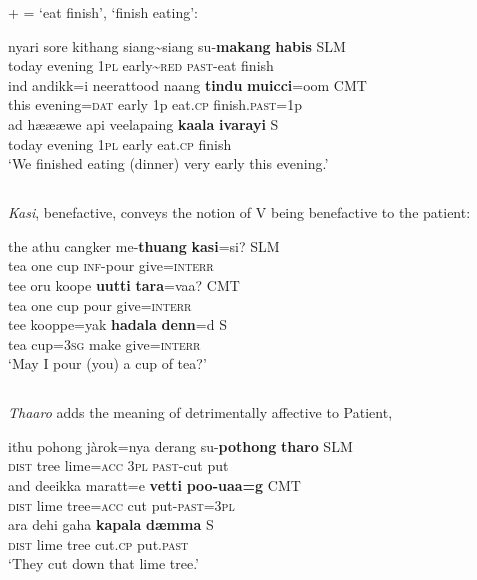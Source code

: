  +  = `eat finish', `finish eating':

\ea\label{jaffar:ex:55}
\ea
\gll nyari sore kithang siang\~{}siang su-\textbf{makang} \textbf{habis} SLM \\
 today evening 1\textsc{pl}    early\~{}\textsc{red} \textsc{past}-eat finish\\
\ex%
\gll ind{\E} andikk=i neerattood{\E} naang{\E} \textbf{tindu}              \textbf{mu{\dz}icci{\textrtailt}{\textrtailt}}=oom CMT \\
 this evening=\textsc{dat}  early     1p  eat.\textsc{cp}  finish.\textsc{past}=1p\\
\ex%
\gll ad{\E} h{\ae}{\und}{\ae}{\ae}we api veelapaing \textbf{kaala} \textbf{ivarayi} S \\
 today evening 1\textsc{pl} early eat.\textsc{cp}  finish\\
`We finished eating (dinner) very early this evening.'
\z{}
\z

\subsection{}
{\em Kasi}, benefactive, conveys the notion of V being benefactive to the patient:

\ea
\ea\label{jaffar:ex:58}
\gll the athu cangker me-\textbf{thuang} \textbf{kasi}=si? SLM \\
 tea one cup \textsc{inf}-pour give=\textsc{interr}\\
\ex%
\gll tee oru koope \textbf{uutti} \textbf{tara}=vaa? CMT \\
 tea one cup pour give=\textsc{interr}\\
\ex%
\gll tee kooppe=yak \textbf{hadala} \textbf{denn{\E}}=d{\E} S \\
 tea cup=3\textsc{sg} make give=\textsc{interr}\\
 `May I pour (you) a cup of tea?'
\z
\z

\subsection{}
{\em Thaaro} adds the meaning of detrimentally affective to Patient,

\ea\label{jaffar:ex:61}
\ea
\gll ithu pohong jàrok=nya derang su-\textbf{pothong} \textbf{tharo} SLM \\
 \textsc{dist} tree lime=\textsc{acc}  3\textsc{pl} \textsc{past}-cut put\\
\ex%
\gll and{\E} dee{\textesh}ikka maratt=e \textbf{vetti} \textbf{poo-{\textrtailt}{\textrtailt}u{\textrtailt}aa={\ng}g{\E}} CMT \\
 \textsc{dist} lime tree=\textsc{acc}  cut put-\textsc{past}=3\textsc{pl}\\
\ex%
\gll ara dehi gaha \textbf{kapala} \textbf{d{\ae}mma} S \\
 \textsc{dist} lime tree  cut.\textsc{cp} put.\textsc{past}\\
 `They cut down that lime tree.'
\z
\z

